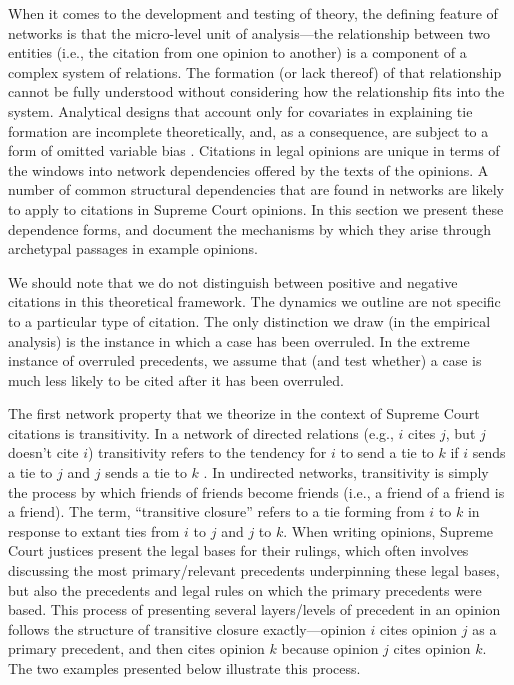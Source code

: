 \documentclass[headsepline=true, abstracton]{scrartcl}
\begin{document}
When it comes to the development and testing of theory, the defining feature of networks is that the micro-level unit of analysis---the relationship between two entities (i.e., the citation from one opinion to another) is a component of a complex system of relations. The formation (or lack thereof) of that relationship cannot be fully understood without considering how the relationship fits into the system. Analytical designs that account only for covariates in explaining tie formation are incomplete theoretically, and, as a consequence, are subject to a form of omitted variable bias \citep{cranmer2016critique}. Citations in legal opinions are unique in terms of the windows into network dependencies offered by the texts of the opinions. A number of common structural dependencies that are found in networks are likely to apply to citations in Supreme Court opinions. In this section we present these dependence forms, and document the mechanisms by which they arise through archetypal passages in example opinions. 

We should note that we do not distinguish between positive and negative citations in this theoretical framework. The dynamics we outline are not specific to a particular type of citation. The only distinction we draw (in the empirical analysis) is the instance in which a case has been overruled. In the extreme instance of overruled precedents, we assume that (and test whether) a case is much less likely to be cited after it has been overruled.

The first network property that we theorize in the context of Supreme Court citations is transitivity. In a network of directed relations (e.g., $i$ cites $j$, but $j$ doesn't cite $i$) transitivity refers to the tendency for $i$ to send a tie to $k$ if $i$ sends a tie to $j$ and $j$ sends a tie to $k$ \citep{holland1971transitivity,hallinan1990sex}. In undirected networks, transitivity is simply the process by which friends of friends become friends (i.e., a friend of a friend is a friend). The term, ``transitive closure'' refers to a tie forming from $i$ to $k$ in response to extant ties from $i$ to $j$ and $j$ to $k$. When writing opinions, Supreme Court justices present the legal bases for their rulings, which often involves discussing the most primary/relevant precedents underpinning these legal bases, but also the precedents and legal rules on which the primary precedents were based. This process of presenting several layers/levels of precedent in an opinion follows the structure of transitive closure exactly---opinion $i$ cites opinion $j$ as a primary precedent, and then cites opinion $k$ because opinion $j$ cites opinion $k$. The two examples presented below illustrate this process.
\end{document}
